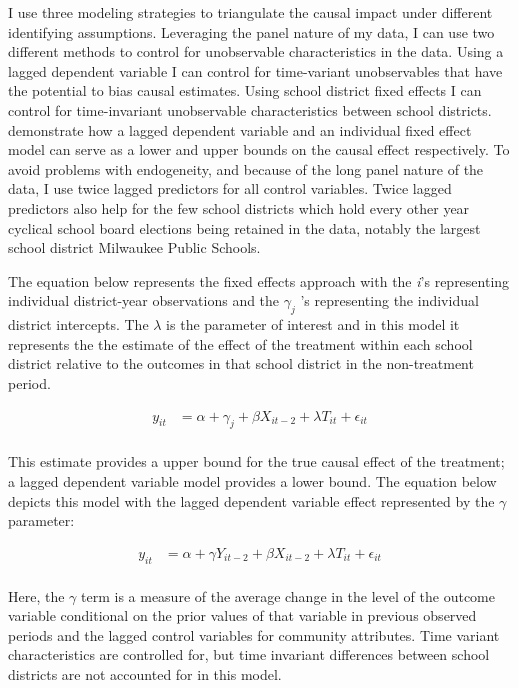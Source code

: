 I use three modeling strategies to triangulate the causal impact under different 
identifying assumptions. Leveraging the panel nature of my data, I can use 
two different methods to control for unobservable characteristics in the 
data. Using a lagged dependent variable I can control for time-variant 
unobservables that have the potential to bias causal estimates. Using school 
district fixed effects I can control for time-invariant unobservable 
characteristics between school districts. \citet{mhecon} demonstrate how a 
lagged dependent variable and an individual fixed effect model 
can serve as a lower and upper bounds on the causal effect respectively. To 
avoid problems with endogeneity, and because of the long panel nature of the 
data, I use twice lagged predictors for all control variables. Twice lagged 
predictors also help for the few school districts which hold every other year 
cyclical school board elections being retained in the data, notably the largest 
school district Milwaukee Public Schools. 

The equation below represents the fixed effects approach with the
\emph{i}'s representing individual district-year observations and the 
$\gamma_{j}$ 's representing the individual district intercepts.
The $\lambda$ is the parameter of interest and in this model it represents the 
the estimate of the effect of the treatment within each school district relative 
to the outcomes in that school district in the non-treatment period. 

\begin{align*} 
y_{it} &= \alpha + \gamma_{j} + \beta X_{it-2} + \lambda T_{it} + \epsilon_{it}  \\ 
\end{align*}

This estimate provides a upper bound for the true causal effect of the treatment; 
a lagged dependent variable model provides a lower bound. The equation below 
depicts this model with the lagged dependent variable effect represented by 
the $\gamma$ parameter:

\begin{align*} 
y_{it} &= \alpha + \gamma Y_{it-2} + \beta X_{it-2} + \lambda T_{it} + \epsilon_{it}  \\ 
\end{align*}

Here, the $\gamma$ term is a measure of the average change in the level of 
the outcome variable conditional on the prior values of that variable in previous 
observed periods and the lagged control variables for community attributes. 
Time variant characteristics are controlled for, but time invariant differences 
between school districts are not accounted for in this model. 

